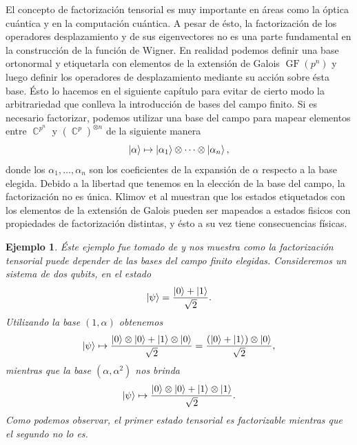\documentclass[a4paper]{report}
\DeclareMathOperator{\C}{\mathbb{C}}
\DeclareMathOperator{\GF}{GF}
\newtheorem{example}{Ejemplo}
\begin{document}
  El concepto de factorización tensorial es muy importante
  en áreas como la óptica cuántica y en la computación
  cuántica. A pesar de ésto, la factorización de los
  operadores desplazamiento y de sus eigenvectores no es una
  parte fundamental en la construcción de la función de
  Wigner. En realidad podemos definir una base ortonormal y
  etiquetarla con elementos de la extensión de Galois
  $\GF\left(p^{n}\right)$ y luego definir los operadores de
  desplazamiento mediante su acción sobre ésta base. Ésto lo
  hacemos en el siguiente capítulo para evitar de cierto
  modo la arbitrariedad que conlleva la introducción de
  bases del campo finito. Si es necesario factorizar,
  podemos utilizar una base del campo para mapear elementos
  entre $\C^{p^{n}}$ y $\left(\C^{p}\right)^{\otimes n}$ de
  la siguiente manera
  \[
    \ket \alpha
    \mapsto \ket{\alpha_1} \otimes \cdots \otimes
    \ket{\alpha_n},
  \] 
  donde los $\alpha_1,\ldots,\alpha_n$ son los coeficientes
  de la expansión de $\alpha$ respecto a la base elegida.
  Debido a la libertad que tenemos en la elección de la base
  del campo, la factorización no es única. Klimov et al
  \cite{bjork2008} muestran que los estados etiquetados con
  los elementos de la extensión de Galois pueden ser
  mapeados a estados fisicos con propiedades de
  factorización distintas, y ésto a su vez tiene
  consecuencias físicas.
  \begin{example}
    Éste ejemplo fue tomado de \cite{bjork2008} y nos
    muestra como la factorización tensorial puede depender
    de las bases del campo finito elegidas. Consideremos un
    sistema de dos qubits, en el estado 
    \begin{equation}
      \ket \psi = \frac{\ket 0 + \ket{1}}{\sqrt{2}}.
    \end{equation}
    Utilizando la base $(1,\alpha)$ obtenemos 
    \begin{equation}
      \ket \psi \mapsto
      \frac{\ket 0 \otimes \ket 0 + \ket 1 \otimes \ket
      0}{\sqrt{2}}
      = \frac{\left( \ket 0 + \ket 1 \right) \otimes \ket
      0}{\sqrt{2}},
    \end{equation}
    mientras que la base $(\alpha,\alpha^2)$ nos brinda 
    \begin{equation}
      \ket \psi \mapsto
      \frac{\ket 0 \otimes \ket 0 + \ket 1 \otimes \ket
      1}{\sqrt{2}}.
    \end{equation}
    Como podemos observar, el primer estado tensorial es
    factorizable mientras que el segundo no lo es.
  \end{example}
\end{document}
